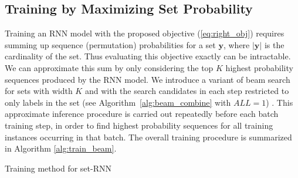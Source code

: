 \subsection{Training by Maximizing Set Probability}
Training an RNN model with the proposed objective (\ref{eq:right_obj}) requires summing up sequence (permutation) probabilities for a set $\mathbf{y}$, where $|\mathbf{y}|$ is the cardinality of the set. Thus evaluating this objective exactly can be intractable. We can approximate this sum by only considering the top $K$ highest probability sequences produced by the RNN model. We introduce a variant of beam search for sets with width $K$ and with the search candidates in each step restricted to only labels in the set (see Algorithm~\ref{alg:beam_combine} with $ALL=1$)%
. This approximate inference procedure is carried out repeatedly before each batch training step, in order to find highest probability sequences for all training instances occurring in that batch. The overall training procedure is summarized in Algorithm \ref{alg:train_beam}.%

\begin{algorithm}

  
  \caption{Training method for set-RNN}
  \label{alg:train_beam}
\end{algorithm}


